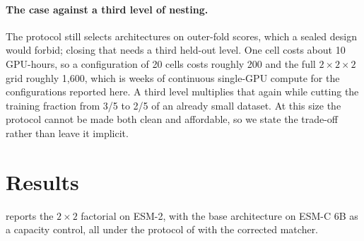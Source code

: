 \documentclass{article}
\begin{document}
\paragraph{The case against a third level of nesting.} The protocol still selects architectures on outer-fold scores, which a sealed design would forbid; closing that needs a third held-out level. One cell costs about 10 GPU-hours, so a configuration of 20 cells costs roughly 200 and the full $2\times2\times2$ grid roughly 1{,}600, which is weeks of continuous single-GPU compute for the configurations reported here. A third level multiplies that again while cutting the training fraction from 3/5 to 2/5 of an already small dataset. At this size the protocol cannot be made both clean and affordable, so we state the trade-off rather than leave it implicit.

\section{Results}
\label{sec:results}

 reports the $2\times2$ factorial on ESM-2, with the base architecture on ESM-C 6B as a capacity control, all under the protocol of  with the corrected matcher.
\end{document}
